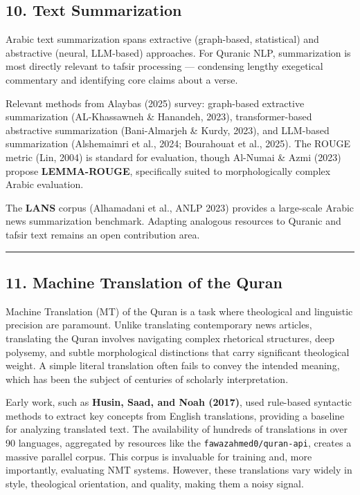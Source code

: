 \documentclass[12pt,a4paper]{article}
\begin{document}
\protect{}\label{s10}
\subsection{10. Text Summarization}\label{text-summarization}

Arabic text summarization spans extractive (graph-based, statistical)
and abstractive (neural, LLM-based) approaches. For Quranic NLP,
summarization is most directly relevant to tafsir processing ---
condensing lengthy exegetical commentary and identifying core claims
about a verse.

Relevant methods from Alayba\textquotesingle s (2025) survey:
graph-based extractive summarization (AL-Khassawneh \& Hanandeh, 2023),
transformer-based abstractive summarization (Bani-Almarjeh \& Kurdy,
2023), and LLM-based summarization (Alshemaimri et al., 2024; Bourahouat
et al., 2025). The ROUGE metric (Lin, 2004) is standard for evaluation,
though Al-Numai \& Azmi (2023) propose \textbf{LEMMA-ROUGE},
specifically suited to morphologically complex Arabic evaluation.

The \textbf{LANS} corpus (Alhamadani et al., ANLP 2023) provides a
large-scale Arabic news summarization benchmark. Adapting analogous
resources to Quranic and tafsir text remains an open contribution area.

\begin{center}\rule{0.5\linewidth}{0.5pt}\end{center}

\protect{}\label{s11}
\subsection{11. Machine Translation of the
Quran}\label{machine-translation-of-the-quran}

Machine Translation (MT) of the Quran is a task where theological and
linguistic precision are paramount. Unlike translating contemporary news
articles, translating the Quran involves navigating complex rhetorical
structures, deep polysemy, and subtle morphological distinctions that
carry significant theological weight. A simple literal translation often
fails to convey the intended meaning, which has been the subject of
centuries of scholarly interpretation.

Early work, such as \textbf{Husin, Saad, and Noah (2017)}, used
rule-based syntactic methods to extract key concepts from English
translations, providing a baseline for analyzing translated text. The
availability of hundreds of translations in over 90 languages,
aggregated by resources like the \texttt{fawazahmed0/quran-api}, creates
a massive parallel corpus. This corpus is invaluable for training and,
more importantly, evaluating NMT systems. However, these translations
vary widely in style, theological orientation, and quality, making them
a noisy signal.
\end{document}
